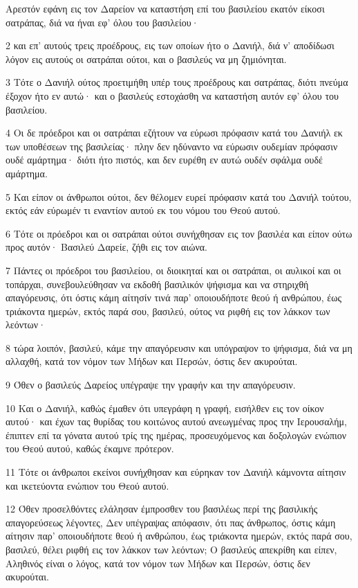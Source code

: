 \par Αρεστόν εφάνη εις τον Δαρείον να καταστήση επί του βασιλείου εκατόν είκοσι σατράπας, διά να ήναι εφ' όλου του βασιλείου·
\par 2 και επ' αυτούς τρεις προέδρους, εις των οποίων ήτο ο Δανιήλ, διά ν' αποδίδωσι λόγον εις αυτούς οι σατράπαι ούτοι, και ο βασιλεύς να μη ζημιόνηται.
\par 3 Τότε ο Δανιήλ ούτος προετιμήθη υπέρ τους προέδρους και σατράπας, διότι πνεύμα έξοχον ήτο εν αυτώ· και ο βασιλεύς εστοχάσθη να καταστήση αυτόν εφ' όλου του βασιλείου.
\par 4 Οι δε πρόεδροι και οι σατράπαι εζήτουν να εύρωσι πρόφασιν κατά του Δανιήλ εκ των υποθέσεων της βασιλείας· πλην δεν ηδύναντο να εύρωσιν ουδεμίαν πρόφασιν ουδέ αμάρτημα· διότι ήτο πιστός, και δεν ευρέθη εν αυτώ ουδέν σφάλμα ουδέ αμάρτημα.
\par 5 Και είπον οι άνθρωποι ούτοι, δεν θέλομεν ευρεί πρόφασιν κατά του Δανιήλ τούτου, εκτός εάν εύρωμέν τι εναντίον αυτού εκ του νόμου του Θεού αυτού.
\par 6 Τότε οι πρόεδροι και οι σατράπαι ούτοι συνήχθησαν εις τον βασιλέα και είπον ούτω προς αυτόν· Βασιλεύ Δαρείε, ζήθι εις τον αιώνα.
\par 7 Πάντες οι πρόεδροι του βασιλείου, οι διοικηταί και οι σατράπαι, οι αυλικοί και οι τοπάρχαι, συνεβουλεύθησαν να εκδοθή βασιλικόν ψήφισμα και να στηριχθή απαγόρευσις, ότι όστις κάμη αίτησίν τινά παρ' οποιουδήποτε θεού ή ανθρώπου, έως τριάκοντα ημερών, εκτός παρά σου, βασιλεύ, ούτος να ριφθή εις τον λάκκον των λεόντων·
\par 8 τώρα λοιπόν, βασιλεύ, κάμε την απαγόρευσιν και υπόγραψον το ψήφισμα, διά να μη αλλαχθή, κατά τον νόμον των Μήδων και Περσών, όστις δεν ακυρούται.
\par 9 Όθεν ο βασιλεύς Δαρείος υπέγραψε την γραφήν και την απαγόρευσιν.
\par 10 Και ο Δανιήλ, καθώς έμαθεν ότι υπεγράφη η γραφή, εισήλθεν εις τον οίκον αυτού· και έχων τας θυρίδας του κοιτώνος αυτού ανεωγμένας προς την Ιερουσαλήμ, έπιπτεν επί τα γόνατα αυτού τρίς της ημέρας, προσευχόμενος και δοξολογών ενώπιον του Θεού αυτού, καθώς έκαμνε πρότερον.
\par 11 Τότε οι άνθρωποι εκείνοι συνήχθησαν και εύρηκαν τον Δανιήλ κάμνοντα αίτησιν και ικετεύοντα ενώπιον του Θεού αυτού.
\par 12 Όθεν προσελθόντες ελάλησαν έμπροσθεν του βασιλέως περί της βασιλικής απαγορεύσεως λέγοντες, Δεν υπέγραψας απόφασιν, ότι πας άνθρωπος, όστις κάμη αίτησιν παρ' οποιουδήποτε θεού ή ανθρώπου, έως τριάκοντα ημερών, εκτός παρά σου, βασιλεύ, θέλει ριφθή εις τον λάκκον των λεόντων; Ο βασιλεύς απεκρίθη και είπεν, Αληθινός είναι ο λόγος, κατά τον νόμον των Μήδων και Περσών, όστις δεν ακυρούται.

